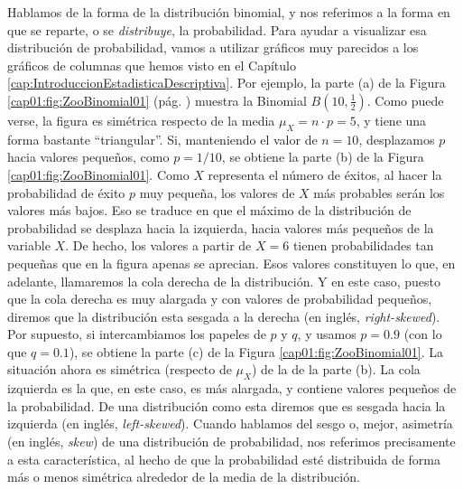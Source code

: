 Hablamos de la forma de la distribución binomial, y nos referimos a la forma en que se reparte, o
se {\em distribuye}, la probabilidad. Para ayudar a visualizar esa distribución de probabilidad,
vamos a utilizar gráficos muy parecidos a los gráficos de columnas que hemos visto en el Capítulo
\ref{cap:IntroduccionEstadisticaDescriptiva}. Por ejemplo, la parte (a) de la Figura
\ref{cap01:fig:ZooBinomial01} (pág. \pageref{cap01:fig:ZooBinomial01}) muestra la Binomial
$B(10,\frac{1}{2})$. Como puede verse, la figura es simétrica respecto de la media $\mu_X=n\cdot
p=5$, y tiene una forma bastante ``triangular''.  Si, manteniendo el valor de $n=10$, desplazamos
$p$ hacia valores pequeños, como $p=1/10$, se obtiene la parte (b) de la Figura
\ref{cap01:fig:ZooBinomial01}.  Como $X$ representa el número de éxitos, al hacer la probabilidad
de éxito $p$ muy pequeña, los valores de $X$ más probables serán los valores más bajos. Eso se
traduce en que el máximo de la distribución de probabilidad se desplaza hacia la izquierda, hacia
valores más pequeños de la variable $X$. De hecho, los valores a partir de $X=6$ tienen
probabilidades tan pequeñas que en la figura apenas se aprecian. Esos valores constituyen lo que,
en adelante, llamaremos la {\sf cola derecha} de la distribución. Y en este caso, puesto que la cola derecha es muy alargada y
con valores de probabilidad pequeños, diremos que la distribución esta {\sf sesgada a la
derecha} (en inglés, {\em
right-skewed}). Por supuesto, si intercambiamos los papeles de $p$ y $q$, y
usamos $p=0.9$ (con lo que $q=0.1$), se obtiene la parte (c) de la Figura
\ref{cap01:fig:ZooBinomial01}. La situación ahora es simétrica (respecto de $\mu_X$) de la de la
parte (b). La {\sf cola izquierda} es la que, en este caso, es más alargada, y contiene valores
pequeños de la probabilidad. De una distribución como esta diremos que es sesgada hacia la
izquierda (en  inglés, {\em left-skewed}). Cuando hablamos del {\sf sesgo} o, mejor, {\sf
asimetría} (en inglés, {\em skew}) de una distribución de
probabilidad, nos referimos precisamente a esta característica, al hecho de que la probabilidad
esté distribuida de forma más o menos simétrica alrededor de la media de la distribución.


